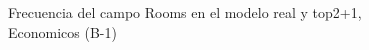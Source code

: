 \begin{figure}[H]
    \centering
    
    \caption{Frecuencia del campo Rooms en el modelo real y top2+1, Economicos (B-1)}
    \label{frecuency-Rooms-top2+1}
\end{figure}